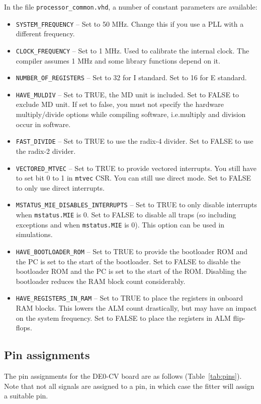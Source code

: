 \documentclass[12pt]{article}
\begin{document}
In the file \lstinline|processor_common.vhd|, a number of constant parameters are available:
\begin{itemize}
\item \lstinline|SYSTEM_FREQUENCY| -- Set to 50 MHz. Change this if you use a PLL with a different frequency.
\item \lstinline|CLOCK_FREQUENCY| -- Set to 1 MHz. Used to calibrate the internal clock. The compiler assumes 1 MHz and some library functions depend on it.
\item \lstinline|NUMBER_OF_REGISTERS| -- Set to 32 for I standard. Set to 16 for E standard.
\item \lstinline|HAVE_MULDIV| -- Set to TRUE, the MD unit is included. Set to FALSE to exclude MD unit. If set to false, you must not specify the hardware multiply/divide options while compiling software, i.e.\@ multiply and division occur in software.
\item \lstinline|FAST_DIVIDE| -- Set to TRUE to use the radix-4 divider. Set to FALSE to use the radix-2 divider.
\item \lstinline|VECTORED_MTVEC| -- Set to TRUE to provide vectored interrupts. You still have to set bit 0 to 1 in \lstinline|mtvec| CSR. You can still use direct mode. Set to FALSE to only use direct interrupts.
\item \lstinline|MSTATUS_MIE_DISABLES_INTERRUPTS| -- Set to TRUE to only disable interrupts when \lstinline|mstatus.MIE| is 0. Set to FALSE to disable all traps (so including exceptions and when \lstinline|mstatus.MIE| is 0). This option can be used in simulations.
\item \lstinline|HAVE_BOOTLOADER_ROM| -- Set to TRUE to provide the bootloader ROM and the PC is set to the start of the bootloader. Set to FALSE to disable the bootloader ROM and the PC is set to the start of the ROM. Disabling the bootloader reduces the RAM block count considerably.
\item \lstinline|HAVE_REGISTERS_IN_RAM| -- Set to TRUE to place the registers in onboard RAM blocks. This lowers the ALM count drastically, but may have an impact on the system frequency. Set to FALSE to place the registers in ALM flip-flops.
\end{itemize}

\subsection{Pin assignments}
The pin assignments for the DE0-CV board are as follows (Table~\ref{tab:pins}). Note that not all signals are assigned to a pin, in which case the fitter will assign a suitable pin.
\end{document}
